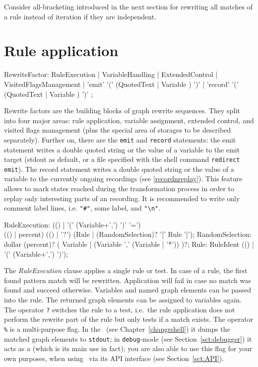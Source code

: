 \begin{note}
Consider all-bracketing introduced in the next section for rewriting all matches of a rule instead of iteration if they are independent.
\end{note}

\section{Rule application}

\begin{rail} 
  RewriteFactor: RuleExecution
     | VariableHandling
     | ExtendedControl
     | VisitedFlagsManagement
     | 'emit' '(' (QuotedText | Variable ) ')'
     | 'record' '(' (QuotedText | Variable ) ')'
	; 
\end{rail}\label{recstmt}

Rewrite factors are the building blocks of graph rewrite sequences.
They split into four major areas: rule application, variable assignment, extended control, and visited flags management (plus the special area of storages to be described separately).
Further on, there are the \texttt{emit} and \texttt{record} statements: the emit statement writes a double quoted string or the value of a variable to the emit target (stdout as default, or a file specified with the shell command \texttt{redirect emit}). The record statement writes a double quoted string or the value of a variable to the currently ongoing recordings (see \ref{recordnreplay}). This feature allows to mark states reached during the transformation process in order to replay only interesting parts of an recording. It is recommended to write only comment label lines, i.e. \verb/"#"/, some label, and \verb/"\n"/.

\begin{rail}    
  RuleExecution: (() | '(' (Variable+',') ')' '=') \\ (() | percent) (() | '?') (Rule | (RandomSelection)? '[' Rule ']');
  RandomSelection: dollar (percent)? ( Variable | (Variable ',' (Variable | '*')) )?;
  Rule: RuleIdent (() | '(' (Variable+',') ')');
\end{rail}
The \emph{RuleExecution} clause applies a single rule or test.
In case of a rule, the first found pattern match will be rewritten.
Application will fail in case no match was found and succeed otherwise. 
Variables and named graph elements can be passed into the rule.
The returned graph elements can be assigned to variables again.
The operator \texttt{?} switches the rule to a test, i.e.\ the rule application does not perform the rewrite part of the rule but only tests if a match exists.
The operator \texttt{\%} is a multi-purpose flag. 
In the \GrShell\ (see Chapter~\ref{chapgrshell}) it dumps the matched graph elements to \texttt{stdout};
in \texttt{debug}-mode (see Section~\ref{sct:debugger}) it acts as a  (which is its main use in fact);
you are also able to use this flag for your own purposes, when using \GrG\ via its API interface (see Section~\ref{sct:API}).

